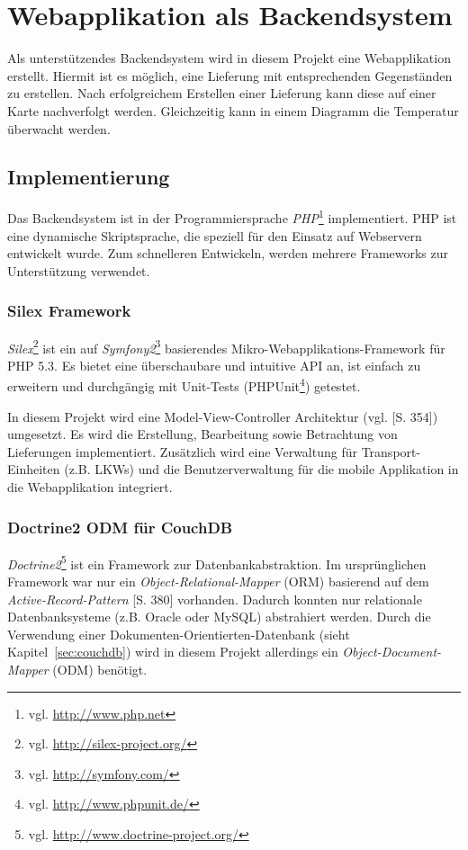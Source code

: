 \section{Webapplikation als Backendsystem}
\label{sec:webapplication}

Als unterstützendes Backendsystem wird in diesem Projekt eine Webapplikation
	erstellt. Hiermit ist es möglich, eine Lieferung mit entsprechenden
	Gegenständen zu erstellen. Nach erfolgreichem Erstellen einer Lieferung
	kann diese auf einer Karte nachverfolgt werden. Gleichzeitig kann in
	einem Diagramm die Temperatur überwacht werden.

\subsection{Implementierung}

Das Backendsystem ist in der Programmiersprache \emph{PHP}\footnote{vgl.
	\url{http://www.php.net}} implementiert. PHP ist eine dynamische
	Skriptsprache, die speziell für den Einsatz auf Webservern entwickelt
	wurde. Zum schnelleren Entwickeln, werden mehrere Frameworks zur
	Unterstützung verwendet.
	
\subsubsection{Silex Framework}
\emph{Silex}\footnote{vgl. \url{http://silex-project.org/}} ist ein auf
	\emph{Symfony2}\footnote{vgl. \url{http://symfony.com/}} basierendes
	Mikro-Webapplikations-Framework für PHP 5.3. Es bietet eine überschaubare
	und intuitive API an, ist einfach zu erweitern und durchgängig mit
	Unit-Tests (PHPUnit\footnote{vgl. \url{http://www.phpunit.de/}}) getestet.
	
In diesem Projekt wird eine Model-View-Controller Architektur (vgl.
	\cite{Schmidt09}[S. 354]) umgesetzt. Es wird die Erstellung, Bearbeitung
	sowie Betrachtung von Lieferungen implementiert. Zusätzlich wird eine
	Verwaltung für Transport-Einheiten (z.B. LKWs) und die Benutzerverwaltung
	für die mobile Applikation in die Webapplikation integriert.
		
\subsubsection{Doctrine2 ODM für CouchDB}
\emph{Doctrine2}\footnote{vgl. \url{http://www.doctrine-project.org/}} ist ein
	Framework zur Datenbankabstraktion. Im ursprünglichen Framework war nur ein
	\emph{Object-Relational-Mapper} (ORM) basierend auf dem
	\emph{Active-Record-Pattern} \cite{Schmidt09}[S. 380] vorhanden. Dadurch
	konnten nur relationale	Datenbanksysteme (z.B. Oracle oder MySQL) abstrahiert
	werden. Durch die Verwendung einer Dokumenten-Orientierten-Datenbank (sieht
	Kapitel~\ref{sec:couchdb}) wird in diesem Projekt allerdings ein
	\emph{Object-Document-Mapper} (ODM) benötigt.
	
